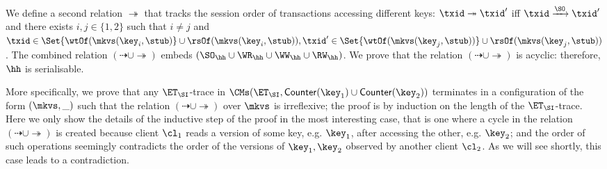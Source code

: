 We define a second relation $\twoheadrightarrow$ that tracks the session order of transactions accessing different keys: 
$\txid \twoheadrightarrow \txid'$ iff $\txid \xrightarrow{\SO} \txid'$ and there exists $i,j \in \{1,2\}$ such that
$i \neq j$ and $\txid \in \Set{\wtOf(\mkvs(\key_{i}, \stub)} \cup \rsOf(\mkvs(\key_{i}, \stub)),  
\txid' \in \Set{\wtOf(\mkvs(\key_{j}, \stub))} \cup \rsOf(\mkvs(\key_{j}, \stub))$.
The combined relation $(\dashrightarrow \cup \twoheadrightarrow)$ embeds 
$(\SO_{\hh} \cup \WR_{\hh} \cup \WW_{\hh} \cup \RW_{\hh})$. We prove that the relation $(\dashrightarrow \cup \twoheadrightarrow)$ 
is acyclic: therefore, $\hh$ is serialisable. 

More specifically, we prove that any $\ET_{\SI}$-trace
in $\CMs(\ET_{\SI}, \mathsf{Counter}(\key_1) \cup \mathsf{Counter}(\key_2))$ terminates in a configuration of the form $(\mkvs, \_)$ 
such that the relation $(\dashrightarrow \cup \twoheadrightarrow)$ over $\mkvs$ is irreflexive; the proof is by induction on the 
length of the $\ET_{\SI}$-trace. Here we only show the details of the inductive step of the proof in the most interesting case, 
that is one where a cycle in the relation $(\dashrightarrow \cup \twoheadrightarrow)$ is created because 
client $\cl_{1}$ reads a version of some key, e.g. $\key_{1}$, after accessing the other, e.g. $\key_{2}$; and the order 
of such operations seemingly contradicts the order of the versions of $\key_{1}, \key_{2}$ observed by another client 
$\cl_{2}$. As we will see shortly, this case leads to a contradiction. 


